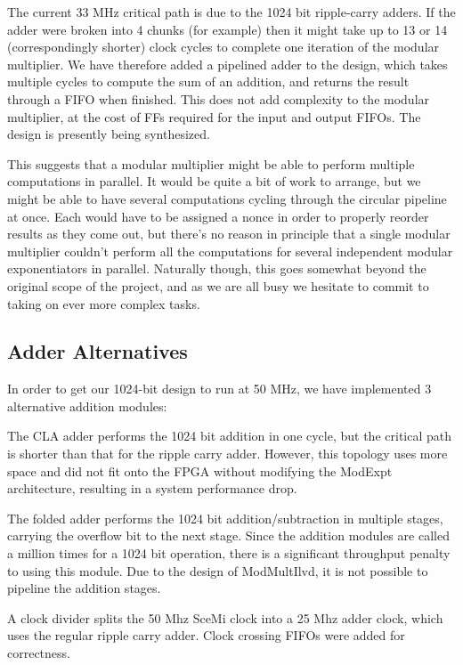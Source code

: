 \documentclass[12pt]{article}
\begin{document}
The current 33 MHz critical path is due to the 1024 bit ripple-carry adders. If the adder were broken 
into 4 chunks (for example) then it might take up to 13 or 14 (correspondingly shorter) clock cycles to complete 
one iteration of the modular multiplier. We have therefore added a pipelined adder to the design, which takes multiple
cycles to compute the sum of an addition, and returns the result through a FIFO when finished. This does not
add complexity to the modular multiplier, at the cost of FFs required for the input and output FIFOs. The
design is presently being synthesized. 

This suggests that a modular multiplier might be able to perform multiple computations in parallel.
It would be quite a bit of work to arrange,
but we might be able to have several computations cycling through the circular pipeline at once.
Each would have to be assigned a nonce in order to properly reorder results as they come out,
but there's no reason in principle that a single modular multiplier couldn't perform all the computations
for several independent modular exponentiators in parallel.
Naturally though, this goes somewhat beyond the original scope of the project,
and as we are all busy we hesitate to commit to taking on ever more complex tasks.
\subsection{Adder Alternatives}
In order to get our 1024-bit design to run at 50 MHz, we have implemented 3 alternative addition modules:

The CLA adder performs the 1024 bit addition in one cycle, but the critical path
is shorter than that for the ripple carry adder. However, this topology uses more
space and did not fit onto the FPGA without modifying the ModExpt architecture, resulting
in a system performance drop.

The folded adder performs the 1024 bit addition/subtraction in multiple stages, carrying
the overflow bit to the next stage. Since the addition modules are called a million times for a
1024 bit operation, there is a significant throughput penalty to using this module. Due to 
the design of ModMultIlvd, it is not possible to pipeline the addition stages.

A clock divider splits the 50 Mhz SceMi clock into a 25 Mhz adder clock, which uses
the regular ripple carry adder. Clock crossing FIFOs were added for correctness.
\end{document}
